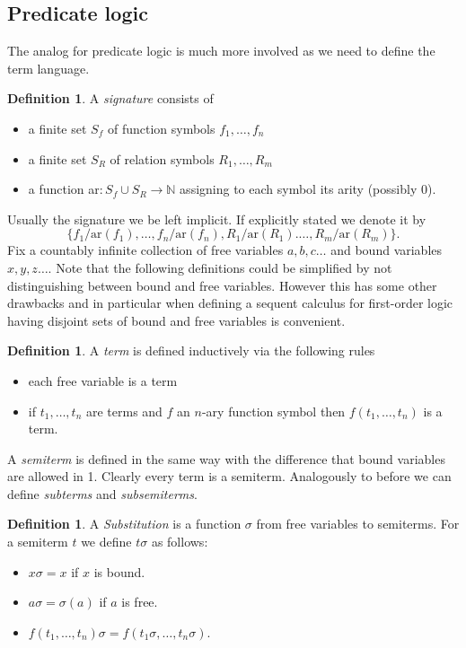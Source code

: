 \documentclass[a4paper,12pt]{report}
\theoremstyle{definition}
\theoremstyle{definition}
\theoremstyle{definition}
\theoremstyle{definition}
\theoremstyle{definition}
\newtheorem{definition}[theorem]{Definition}
\theoremstyle{definition}
\theoremstyle{definition}
\begin{document}
	\subsection{Predicate logic}
	
	The analog for predicate logic is much more involved as we need to define the term language.
	
	\begin{definition}
		A \textit{signature} consists of
		\begin{itemize}
			\item a finite set $S_f$ of function symbols $f_1, \dots, f_n$
			\item a finite set $S_R$ of relation symbols $R_1,\dots, R_m$
			\item  a function ar$: S_f\cup S_R\to \mathbb{N}$ assigning to each symbol its arity (possibly 0).
		\end{itemize}
	\end{definition}
	
	\noindent Usually the signature we be left implicit. If explicitly stated we denote it by $$\{f_1/\text{ar}(f_1),\dots,f_n/\text{ar}(f_n), R_1/\text{ar}(R_1).\dots,R_m/\text{ar}(R_m)\}.$$
	Fix a countably infinite collection of free variables $a, b, c\dots$ and bound variables $x, y, z\dots$.
	Note that the following definitions could be simplified by not distinguishing between bound and free variables. However this has some other drawbacks and in particular when defining a sequent calculus for first-order logic having disjoint sets of bound and free variables is convenient.
	
	\begin{definition}
		A \textit{term} is defined inductively via the following rules
		\begin{itemize}
			\item each free variable is a term
			\item if $t_1,\dots,t_n$ are terms and $f$ an $n$-ary function symbol then $f(t_1, \dots, t_n)$ is a term.
		\end{itemize}
		A \textit{semiterm} is defined in the same way with the difference that bound variables are allowed in 1. Clearly every term is a semiterm. Analogously to before we can define \textit{subterms} and \textit{subsemiterms}.
	\end{definition}

	\begin{definition}
		A \textit{Substitution} is a function $\sigma$ from free variables to semiterms. For a semiterm $t$ we define $t\sigma$ as follows:
		\begin{itemize}
			\item $x\sigma = x$ if $x$ is bound.
			\item $a\sigma = \sigma(a)$ if $a$ is free.
			\item $f(t_1,\dots,t_n)\sigma = f(t_1\sigma,\dots,t_n\sigma)$.
		\end{itemize}
	\end{definition}
	
\end{document}
